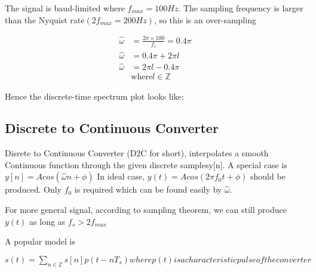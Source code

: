 \documentclass{article}
\newlength\tindent
\renewcommand{\indent}{\hspace*{\tindent}}
\begin{document}
    The signal is baud-limited where $f_{max} = 100 Hz$. 
    The sampling frequency is larger than the Nyquist rate$(2f_{max} = 200 Hz)$, so this is an over-sampling

    \begin{align}
        \hat{\omega} &= \frac{2\pi \times 100}{f_s} = 0.4\pi\\
        \hat{\omega} &= 0.4 \pi + 2\pi l\\
        \hat{\omega} &= 2\pi l - 0.4 \pi\\
        &\text{where} l \in \mathbb{Z} \nonumber
    \end{align}

    Hence the discrete-time spectrum plot looks like:
    \begin{center}
    \end{center}

    \subsection{Discrete to Continuous Converter}
    Disrete to Continuous Converter (D2C for short), interpolates a smooth Continuous function 
    through the given discrete samplesy[n].
    A special case is $y[n] = Acos(\hat{\omega} n + \phi)$ In ideal case, $y(t) = Acos(2\pi f_0 t + \phi)$
    should be produced. Only $f_0$ is required which can be found easily by $\hat{\omega}$.\newline\indent

    \noindent For more general signal, according to sampling theorem, we can still produce $y(t)$ as long as $f_s > 2f_{max}$

    \noindent A popular model is \newline\indent
    
    $s(t) = \sum_{n \in \mathbb{Z}}{s[n]p(t-nT_s)} where p(t) is a characteristic pulse of the converter$\newline\indent
    
\end{document}
